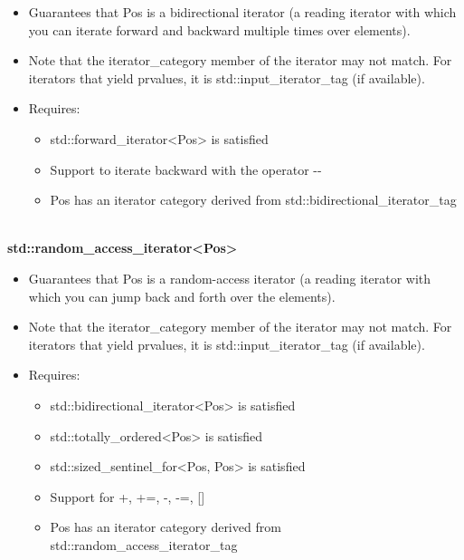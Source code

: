 \begin{itemize}
\item
Guarantees that Pos is a bidirectional iterator (a reading iterator with which you can iterate forward and backward multiple times over elements).

\item
Note that the iterator\_category member of the iterator may not match. For iterators that yield prvalues, it is std::input\_iterator\_tag (if available).

\item
Requires:
\begin{itemize}
\item
std::forward\_iterator<Pos> is satisfied

\item
Support to iterate backward with the operator -{}-

\item
Pos has an iterator category derived from std::bidirectional\_iterator\_tag
\end{itemize}
\end{itemize}

\noindent
\hspace*{\fill} \\ %
\textbf{std::random\_access\_iterator<Pos>}

\begin{itemize}
\item
Guarantees that Pos is a random-access iterator (a reading iterator with which you can jump back and forth over the elements).

\item
Note that the iterator\_category member of the iterator may not match. For iterators that yield prvalues, it is std::input\_iterator\_tag (if available).

\item
Requires:
\begin{itemize}
\item
std::bidirectional\_iterator<Pos> is satisfied

\item
std::totally\_ordered<Pos> is satisfied

\item
std::sized\_sentinel\_for<Pos, Pos> is satisfied

\item
Support for +, +=, -, -=, []

\item
Pos has an iterator category derived from std::random\_access\_iterator\_tag
\end{itemize}
\end{itemize}


